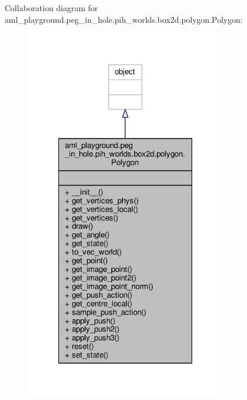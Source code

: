 Collaboration diagram for aml\-\_\-playground.\-peg\-\_\-in\-\_\-hole.\-pih\-\_\-worlds.\-box2d.\-polygon.\-Polygon\-:\nopagebreak
\begin{figure}[H]
\begin{center}
\leavevmode
\includegraphics[width=250pt]{classaml__playground_1_1peg__in__hole_1_1pih__worlds_1_1box2d_1_1polygon_1_1_polygon__coll__graph}
\end{center}
\end{figure}

